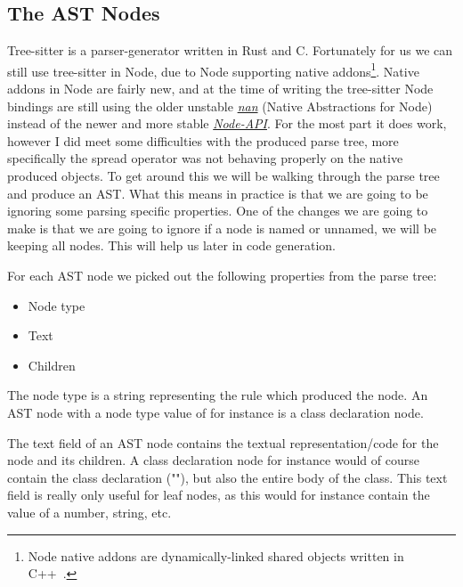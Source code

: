 
\subsection{The AST Nodes}\label{subsec:the-ast-nodes}

Tree-sitter is a parser-generator written in Rust and C.
Fortunately for us we can still use tree-sitter in Node, due to Node supporting native addons\footnote{Node native addons are dynamically-linked shared objects written in C++~\cite{nodenativeaddons}.}.
Native addons in Node are fairly new, and at the time of writing the tree-sitter Node bindings are still using the older unstable \textit{\hyperref[https://github.com/nodejs/nan]{nan}} (Native Abstractions for Node) instead of the newer and more stable \textit{\hyperref[https://nodejs.org/api/n-api.html]{Node-API}}.
For the most part it does work, however I did meet some difficulties with the produced parse tree, more specifically the spread operator was not behaving properly on the native produced objects.
To get around this we will be walking through the parse tree and produce an AST\@.
What this means in practice is that we are going to be ignoring some parsing specific properties.
One of the changes we are going to make is that we are going to ignore if a node is named or unnamed, we will be keeping all nodes.
This will help us later in code generation.

For each AST node we picked out the following properties from the parse tree:

\begin{itemize}
    \item Node type
    \item Text
    \item Children
\end{itemize}

The node type is a string representing the rule which produced the node.
An AST node with a node type value of  for instance is a class declaration node.

The text field of an AST node contains the textual representation/code for the node and its children.
A class declaration node for instance would of course contain the class declaration (""), but also the entire body of the class.
This text field is really only useful for leaf nodes, as this would for instance contain the value of a number, string, etc.

